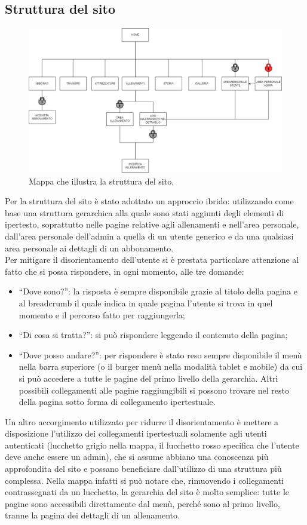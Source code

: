 \documentclass[a4paper]{article}
\begin{document}
	\subsection{Struttura del sito}
	\begin{figure}
		\centering
		\includegraphics[scale=0.3]{immagini/mappa_sito.drawio.png}
		\caption{Mappa che illustra la struttura del sito.}
	\end{figure}
	
	Per la struttura del sito è stato adottato un approccio ibrido: utilizzando come base una struttura gerarchica alla quale sono stati aggiunti degli elementi di ipertesto, soprattutto nelle pagine relative agli allenamenti e nell'area personale, dall'area personale dell'admin a quella di un utente generico e da una qualsiasi area personale ai dettagli di un abbonamento.\\
	Per mitigare il disorientamento dell'utente si è prestata particolare attenzione al fatto che si possa rispondere, in ogni momento, alle tre domande:
	\begin{itemize}
		\item “Dove sono?”: la risposta è sempre disponibile grazie al titolo della pagina e al breadcrumb il quale indica in quale pagina l'utente si trova in quel momento e il percorso fatto per raggiungerla;
		\item “Di cosa si tratta?”: si può rispondere leggendo il contenuto della pagina;
		\item “Dove posso andare?”: per rispondere è stato reso sempre disponibile il menù nella barra superiore (o il burger menù nella modalità tablet e mobile) da cui si può accedere a tutte le pagine del primo livello della gerarchia. Altri possibili collegamenti alle pagine raggiungibili si possono trovare nel resto della pagina sotto forma di collegamento ipertestuale.
	\end{itemize}
	Un altro accorgimento utilizzato per ridurre il disorientamento è mettere a disposizione l'utilizzo dei collegamenti ipertestuali solamente agli utenti autenticati (lucchetto grigio nella mappa, il lucchetto rosso specifica che l'utente deve anche essere un admin), che si assume abbiano una conoscenza più approfondita del sito e possano beneficiare dall'utilizzo di una struttura più complessa. Nella mappa infatti si può notare che, rimuovendo i collegamenti contrassegnati da un lucchetto, la gerarchia del sito è molto semplice: tutte le pagine sono accessibili direttamente dal menù, perché sono al primo livello, tranne la pagina dei dettagli di un allenamento.
\end{document}
